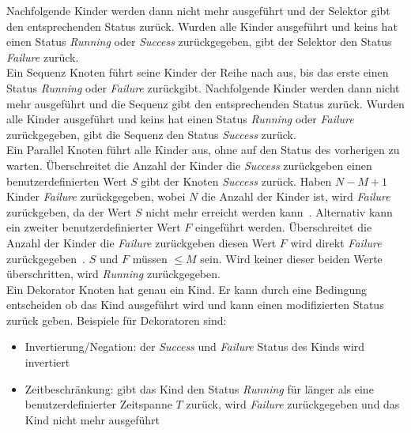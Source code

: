 Nachfolgende Kinder werden dann nicht mehr ausgeführt und der Selektor gibt den entsprechenden Status zurück.
Wurden alle Kinder ausgeführt und keins hat einen Status \emph{Running} oder \emph{Success} zurückgegeben, gibt der Selektor den Status \emph{Failure} zurück.\\
Ein Sequenz Knoten führt seine Kinder der Reihe nach aus, bis das erste einen Status \emph{Running} oder \emph{Failure} zurückgibt.
Nachfolgende Kinder werden dann nicht mehr ausgeführt und die Sequenz gibt den entsprechenden Status zurück.
Wurden alle Kinder ausgeführt und keins hat einen Status \emph{Running} oder \emph{Failure} zurückgegeben, gibt die Sequenz den Status \emph{Success} zurück.\\
Ein Parallel Knoten führt alle Kinder aus, ohne auf den Status des vorherigen zu warten.
Überschreitet die Anzahl der Kinder die \emph{Success} zurückgeben einen benutzerdefinierten Wert $S$ gibt der Knoten \emph{Success} zurück.
Haben $N-M+1$ Kinder \emph{Failure} zurückgegeben, wobei $N$ die Anzahl der Kinder ist, wird \emph{Failure} zurückgeben, da der Wert $S$ nicht mehr erreicht werden kann~\cite{bt_book}.
Alternativ kann ein zweiter benutzerdefinierter Wert $F$ eingeführt werden.
Überschreitet die Anzahl der Kinder die \emph{Failure} zurückgeben diesen Wert $F$ wird direkt \emph{Failure} zurückgegeben~\cite{bt_1}.
$S$ und $F$ müssen $\leq M$ sein.
Wird keiner dieser beiden Werte überschritten, wird \emph{Running} zurückgegeben.\\
Ein Dekorator Knoten hat genau ein Kind.
Er kann durch eine Bedingung entscheiden ob das Kind ausgeführt wird und kann einen modifizierten Status zurück geben.
Beispiele für Dekoratoren sind:
\begin{itemize}
    \item Invertierung/Negation: der \emph{Success} und \emph{Failure} Status des Kinds wird invertiert
    \item Zeitbeschränkung: gibt das Kind den Status \emph{Running} für länger als eine benutzerdefinierter Zeitspanne $T$ zurück, wird \emph{Failure} zurückgegeben und das Kind nicht mehr ausgeführt
\end{itemize}\cite{bt_book}
